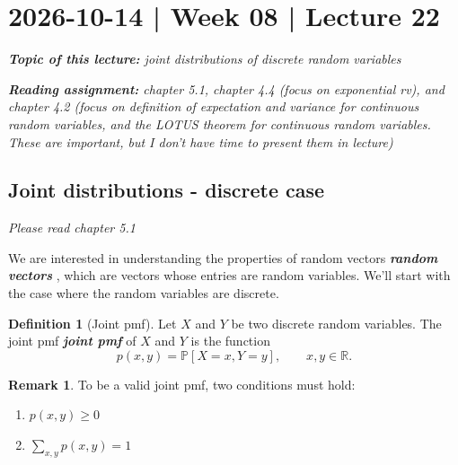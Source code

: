 \documentclass[10pt]{article}
\theoremstyle{definition}
\newtheorem{definition}[theorem]{Definition}
\newtheorem{remark}[theorem]{Remark}
\newcommand{\1}[1]{\textbf{1}_{\left[#1\right]}} %
\def\R{\mathbb{R}} %
\def\E{\mathbb{E}} %
\def\P{\mathbb{P}} %
\def\Var{\mathrm{Var}} %
\DeclareRobustCommand{\demph}[1]{%
  \ifmmode
  {\color{Blue}#1}%
  \else
  {\color{Blue}\bfseries\slshape #1}%
  \fi
}
\begin{document}

\newpage

\section{2026-10-14 | Week 08 | Lecture 22}

\begin{center}
  \begin{tcolorbox}[width=0.9\textwidth, colback=white, colframe=black]
    \textit{\textbf{Topic of this lecture:} joint distributions of discrete
      random variables}

    \textit{\textbf{Reading assignment:} chapter 5.1, chapter 4.4 (focus on
      exponential rv), and chapter 4.2 (focus on definition of expectation and
      variance for continuous random variables, and the LOTUS theorem for
      continuous random variables. These are important, but I don't have time
      to present them in lecture)}
  \end{tcolorbox}
\end{center}

\subsection{Joint distributions - discrete case}
\label{sec:joint-distributions-discrete-case}
\textit{Please read chapter 5.1}

We are interested in understanding the properties of \demph{random vectors},
which are vectors whose entries are random variables. We'll start with the
case where the random variables are discrete.


\begin{definition}[Joint pmf]
  Let $X$ and $Y$ be two discrete random variables. The \demph{joint pmf} of
  $X$ and $Y$ is the function
  \begin{equation*}
    p(x,y) = \P\left[X=x,Y=y \right], \qquad x,y\in \R.
  \end{equation*}
\end{definition}

\begin{remark}
  To be a valid joint pmf, two conditions must hold:
  \begin{enumerate}
    \item  $p(x,y) \geq 0$
    \item $\sum_{x,y}p(x,y)=1$
  \end{enumerate}
\end{remark}
\end{document}
